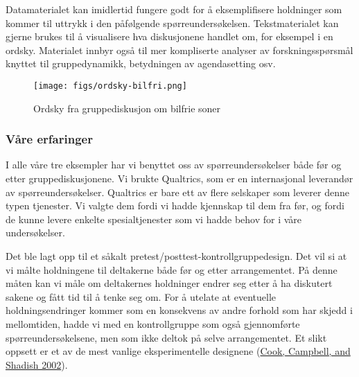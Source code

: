 \documentclass[
  12pt,
  a4paper, 12pt]{article}
\begin{document}
Datamaterialet kan imidlertid fungere godt for å eksemplifisere holdninger som kommer til uttrykk i den påfølgende spørreundersøkelsen. Tekstmaterialet kan gjerne brukes til å visualisere hva diskusjonene handlet om, for eksempel i en ordsky. Materialet innbyr også til mer kompliserte analyser av forskningsspørsmål knyttet til gruppedynamikk, betydningen av agendasetting osv.

\begin{figure}
\centering
\texttt{[image: figs/ordsky-bilfri.png]}
\caption{Ordsky fra gruppediskusjon om bilfrie soner}
\end{figure}

\hypertarget{vuxe5re-erfaringer-5}{%
\subsubsection{Våre erfaringer}\label{vuxe5re-erfaringer-5}}

I alle våre tre eksempler har vi benyttet oss av spørreundersøkelser både før og etter gruppediskusjonene. Vi brukte Qualtrics, som er en internasjonal leverandør av spørreundersøkelser. Qualtrics er bare ett av flere selskaper som leverer denne typen tjenester. Vi valgte dem fordi vi hadde kjennskap til dem fra før, og fordi de kunne levere enkelte spesialtjenester som vi hadde behov for i våre undersøkelser.

Det ble lagt opp til et såkalt pretest/posttest-kontrollgruppedesign. Det vil si at vi målte holdningene til deltakerne både før og etter arrangementet. På denne måten kan vi måle om deltakernes holdninger endrer seg etter å ha diskutert sakene og fått tid til å tenke seg om. For å utelate at eventuelle holdningsendringer kommer som en konsekvens av andre forhold som har skjedd i mellomtiden, hadde vi med en kontrollgruppe som også gjennomførte spørreundersøkelsene, men som ikke deltok på selve arrangementet. Et slikt oppsett er et av de mest vanlige eksperimentelle designene (\protect\hyperlink{ref-cook2002experimental}{Cook, Campbell, and Shadish 2002}).

\begin{table}[!h]

\caption{\label{tab:tbl-design}Eksperimentelt design for deliberativ meningsmåling i Norge 2022}
\centering
{}
\end{table}
\end{document}
